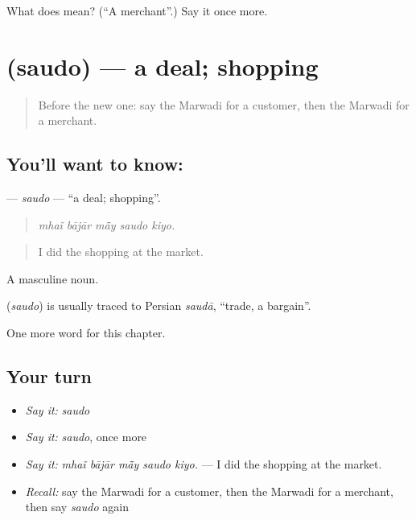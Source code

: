 \begin{tcolorbox}[breakable,colback=teal!4,colframe=teal!35!black,title={Before you move on}]
What does  mean? (\textquotedblleft{}A merchant\textquotedblright{}.) Say it once more.
\end{tcolorbox}
\section[\texorpdfstring{\mw{सौदो} (saudo)}{सौदो (saudo)}]{ (saudo) — a deal; shopping}

\label{lesson:MW-C209-saudo}



\begin{quote}
Before the new one: say the Marwadi for a customer, then the Marwadi for a merchant.
\end{quote}

\subsection*{You'll want to know: }
\textbf{} — \emph{saudo} — \textquotedblleft{}a deal; shopping\textquotedblright{}.

\begin{quote}
    
\end{quote}

\begin{quote}
\emph{mhaĩ bājār mā̃y saudo kiyo.}
\end{quote}

\begin{quote}
I did the shopping at the market.
\end{quote}

A masculine noun.

\begin{cousinweb}
\textbf{} (\emph{saudo}) is usually traced to Persian \emph{saudā}, \textquotedblleft{}trade, a bargain\textquotedblright{}.
\end{cousinweb}

\begin{grammarlens}[title={What you've built}]
One more word for this chapter.
\end{grammarlens}

\subsection*{Your turn}
\begin{itemize}
\raggedright
  \item \emph{Say it:} \emph{saudo}
  \item \emph{Say it:} \emph{saudo}, once more
  \item \emph{Say it:} \emph{mhaĩ bājār mā̃y saudo kiyo.} — I did the shopping at the market.
  \item \emph{Recall:} say the Marwadi for a customer, then the Marwadi for a merchant, then say \emph{saudo} again
\end{itemize}

